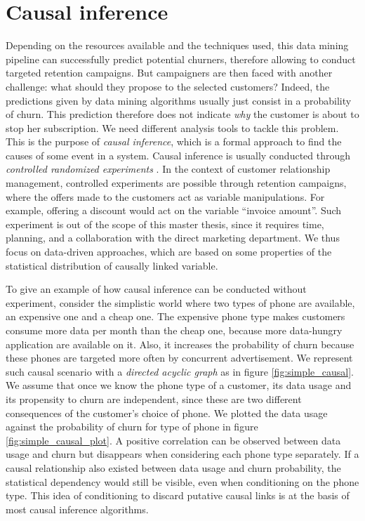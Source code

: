 \section{Causal inference}

Depending on the resources available and the techniques used, this data mining
pipeline can successfully predict potential churners, therefore allowing to
conduct targeted retention campaigns. But campaigners are then faced with
another challenge: what should they propose to the selected customers? Indeed,
the predictions given by data mining algorithms usually just consist in a
probability of churn. This prediction therefore does not indicate \emph{why} the
customer is about to stop her subscription. We need different analysis tools to
tackle this problem. This is the purpose of \emph{causal inference}, which is a
formal approach to find the causes of some event in a system. Causal inference
is usually conducted through \emph{controlled randomized experiments}
\parencite{fisher1937design}. In the context of customer relationship
management, controlled experiments are possible through retention campaigns,
where the offers made to the customers act as variable manipulations. For
example, offering a discount would act on the variable ``invoice amount''. Such
experiment is out of the scope of this master thesis, since it requires time,
planning, and a collaboration with the direct marketing department. We thus
focus on data-driven approaches, which are based on some properties of the
statistical distribution of causally linked variable.

To give an example of how causal inference can be conducted without experiment,
consider the simplistic world where two types of phone are available, an
expensive one and a cheap one. The expensive phone type makes customers consume
more data per month than the cheap one, because more data-hungry application are
available on it. Also, it increases the probability of churn because these
phones are targeted more often by concurrent advertisement. We represent such
causal scenario with a \emph{directed acyclic graph} as in figure
\ref{fig:simple_causal}. We assume that once we know the phone type of a
customer, its data usage and its propensity to churn are independent, since
these are two different consequences of the customer's choice of phone. We
plotted the data usage against the probability of churn for type of phone in
figure \ref{fig:simple_causal_plot}. A positive correlation can be observed
between data usage and churn but disappears when considering each phone type
separately. If a causal relationship also existed between data usage and churn
probability, the statistical dependency would still be visible, even when
conditioning on the phone type. This idea of conditioning to discard putative
causal links is at the basis of most causal inference algorithms.

